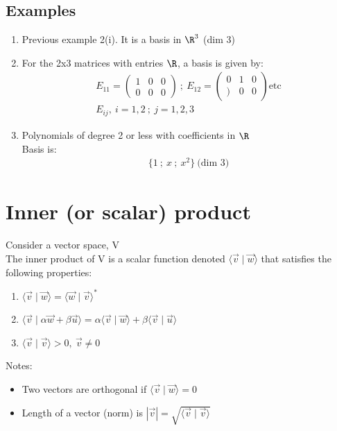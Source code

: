 \documentclass[a4paper, 11pt, normalem]{report}
\begin{document}
\subsection{Examples}
\begin{enumerate}
    \item Previous example 2(i). It is a basis in $\R^3$ (dim 3)
    \item For the 2x3 matrices with entries $\R$, a basis is given by:
            \begin{gather*}
                E_{11} =
                \begin{pmatrix}
                    1 & 0 & 0 \\
                    0 & 0 & 0
                \end{pmatrix} ~;~
                E_{12} =
                \begin{pmatrix}
                    0 & 1 & 0 \\
                    ) & 0 & 0
                \end{pmatrix} \text{etc} \\
                E_{ij},~ i = 1,2 ~;~ j = 1,2,3
            \end{gather*}
    \item Polynomials of degree 2 or less with coefficients in $\R$ \\
          Basis is:
            \begin{gather*}
                \Bigg\{1 ~;~ x ~;~ x^2 \Bigg\} ~\text{(dim 3)}
            \end{gather*}
\end{enumerate}

\section{Inner (or scalar) product}
Consider a vector space, V \\
The inner product of V is a scalar function denoted $\langle \vec{v} \mid \vec{w} \rangle$ that satisfies the following properties:
\begin{enumerate}
    \item $\langle \vec{v} \mid \vec{w} \rangle = \langle \vec{w} \mid \vec{v} \rangle^*$
    \item $\langle \vec{v} \mid \alpha\vec{w} + \beta\vec{u} \rangle = \alpha\langle \vec{v} \mid \vec{w} \rangle + \beta\langle \vec{v} \mid \vec{u} \rangle$
    \item $\langle \vec{v} \mid \vec{v} \rangle > 0,~ \vec{v} \neq 0$
\end{enumerate}
Notes:
\begin{itemize}
    \item Two vectors are orthogonal if $\langle \vec{v} \mid \vec{w} \rangle = 0$
    \item Length of a vector (norm) is $|\vec{v}| = \sqrt{\langle \vec{v} \mid \vec{v} \rangle}$
\end{itemize}
\end{document}

